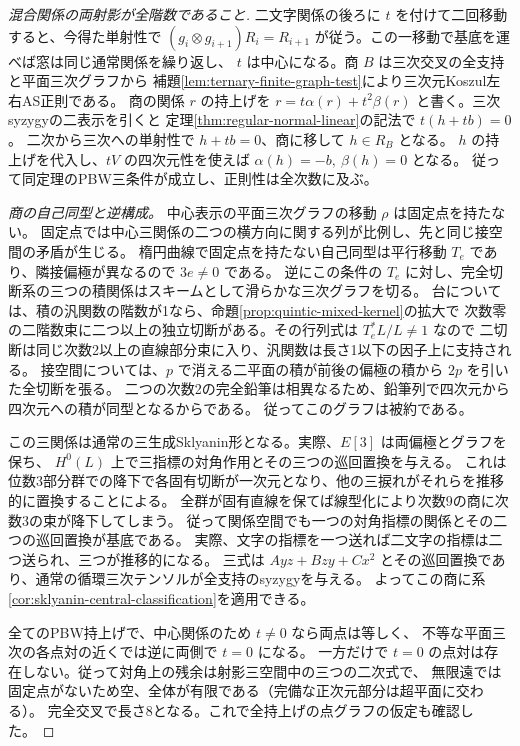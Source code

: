 \begin{proof}[混合関係の両射影が全階数であること]
二文字関係の後ろに $t$ を付けて二回移動すると、今得た単射性で
$(g_i\otimes g_{i+1})R_i=R_{i+1}$ が従う。この一移動で基底を運べば窓は同じ通常関係を繰り返し、
$t$ は中心になる。商 $B$ は三次交叉の全支持と平面三次グラフから
補題\ref{lem:ternary-finite-graph-test}により三次元Koszul左右AS正則である。
商の関係 $r$ の持上げを $r=t\alpha(r)+t^2\beta(r)$ と書く。三次syzygyの二表示を引くと
定理\ref{thm:regular-normal-linear}の記法で $t(h+t b)=0$。
二次から三次への単射性で $h+t b=0$、商に移して $h\in R_B$ となる。
$h$ の持上げを代入し、$tV$ の四次元性を使えば $\alpha(h)=-b,\ \beta(h)=0$ となる。
従って同定理のPBW三条件が成立し、正則性は全次数に及ぶ。

\smallskip
\noindent\textit{商の自己同型と逆構成。}
中心表示の平面三次グラフの移動 $\rho$ は固定点を持たない。
固定点では中心三関係の二つの横方向に関する列が比例し、先と同じ接空間の矛盾が生じる。
楕円曲線で固定点を持たない自己同型は平行移動 $T_e$ であり、隣接偏極が異なるので $3e\ne0$ である。
逆にこの条件の $T_e$ に対し、完全切断系の三つの積関係はスキームとして滑らかな三次グラフを切る。
台については、積の汎関数の階数が1なら、命題\ref{prop:quintic-mixed-kernel}の拡大で
次数零の二階数束に二つ以上の独立切断がある。その行列式は $T_e^*L/L\ne1$ なので
二切断は同じ次数2以上の直線部分束に入り、汎関数は長さ1以下の因子上に支持される。
接空間については、$p$ で消える二平面の積が前後の偏極の積から $2p$ を引いた全切断を張る。
二つの次数2の完全鉛筆は相異なるため、鉛筆列で四次元から四次元への積が同型となるからである。
従ってこのグラフは被約である。

この三関係は通常の三生成Sklyanin形となる。実際、$E[3]$ は両偏極とグラフを保ち、
$H^0(L)$ 上で三指標の対角作用とその三つの巡回置換を与える。
これは位数3部分群での降下で各固有切断が一次元となり、他の三捩れがそれらを推移的に置換することによる。
全群が固有直線を保てば線型化により次数9の商に次数3の束が降下してしまう。
従って関係空間でも一つの対角指標の関係とその二つの巡回置換が基底である。
実際、文字の指標を一つ送れば二文字の指標は二つ送られ、三つが推移的になる。
三式は $A yz+B zy+C x^2$ とその巡回置換であり、通常の循環三次テンソルが全支持のsyzygyを与える。
よってこの商に系\ref{cor:sklyanin-central-classification}を適用できる。

全てのPBW持上げで、中心関係のため $t\ne0$ なら両点は等しく、
不等な平面三次の各点対の近くでは逆に両側で $t=0$ になる。
一方だけで $t=0$ の点対は存在しない。従って対角上の残余は射影三空間中の三つの二次式で、
無限遠では固定点がないため空、全体が有限である（完備な正次元部分は超平面に交わる）。
完全交叉で長さ8となる。これで全持上げの点グラフの仮定も確認した。
\end{proof}

